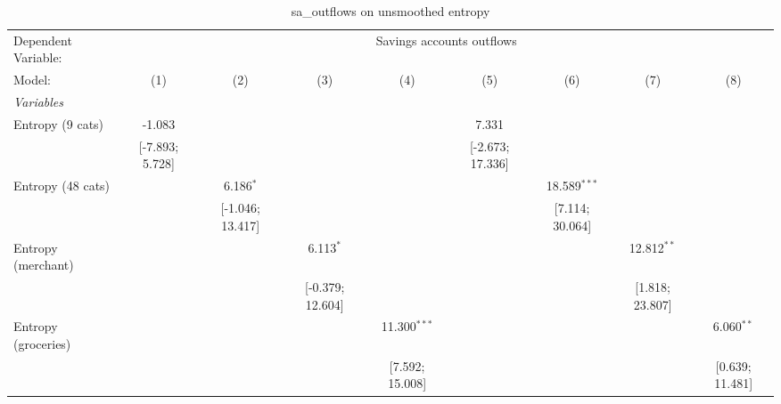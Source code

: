 
\begin{table}[htbp]
   \centering
   \tiny
   \begin{threeparttable}[b]
      \caption{\label{tab:reg_sa_outflows} sa\_outflows on unsmoothed entropy}
      \begin{tabular}{lcccccccc}
         \tabularnewline \midrule \midrule
         Dependent Variable: & \multicolumn{8}{c}{Savings accounts outflows}\\
         Model:                 & (1)                & (2)                & (3)                & (4)                & (5)                 & (6)                 & (7)                 & (8)\\  
         \midrule
         \emph{Variables}\\
         Entropy (9 cats)       & -1.083             &                    &                    &                    & 7.331               &                     &                     &   \\   
                                & [-7.893; 5.728]    &                    &                    &                    & [-2.673; 17.336]    &                     &                     &   \\   
         Entropy (48 cats)      &                    & 6.186$^{*}$        &                    &                    &                     & 18.589$^{***}$      &                     &   \\   
                                &                    & [-1.046; 13.417]   &                    &                    &                     & [7.114; 30.064]     &                     &   \\   
         Entropy (merchant)     &                    &                    & 6.113$^{*}$        &                    &                     &                     & 12.812$^{**}$       &   \\   
                                &                    &                    & [-0.379; 12.604]   &                    &                     &                     & [1.818; 23.807]     &   \\   
         Entropy (groceries)    &                    &                    &                    & 11.300$^{***}$     &                     &                     &                     & 6.060$^{**}$\\   
                                &                    &                    &                    & [7.592; 15.008]    &                     &                     &                     & [0.639; 11.481]\\   

\end{tabular}
\end{threeparttable}
\end{table}
